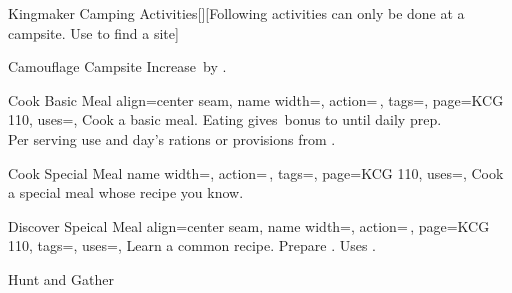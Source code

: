 \begin{PageFront}
\begin{Tables}{\frontTableHeight}
\begin{Table}{Kingmaker Camping Activities}[][Following activities can only be done at a campsite. Use
         to find a site]
\begin{entry}{Camouflage Campsite}
                Increase  \DC\,by .\hfill{}\\
                \phant{}
            \end{entry}
            \begin{entry}{Cook Basic Meal}{%
                align=center seam,
                name width=\activityLength,%
                action=\,,
                tags=\Manipulate,
                page=KCG 110,
                uses={},
            }
                Cook a basic meal. Eating gives \,\Status bonus to  until daily prep.\\
                Per serving use   and  day's rations or provisions from .\\
                 \hfill {}
            \end{entry}
            \begin{entry}{Cook Special Meal}{%
                name width=\activityLength,%
                action=\,,
                tags=\Manipulate,
                page=KCG 110,
                uses={},
            }
                Cook a special meal whose recipe you know. \hfill{}
            \end{entry}
            \begin{entry}{Discover Speical Meal}{%
                align=center seam,
                name width=\activityLength,%
                action=\,,
                page=KCG 110,
                tags=\Manipulate,
                uses=,
            }
                Learn a common recipe. Prepare  . Uses . \hfill
                \\
                \hfill{} \quad {}
            \end{entry}
            \begin{entry}{Hunt and Gather}{%
}
\end{entry}
\end{Table}
\end{Tables}
\end{PageFront}
